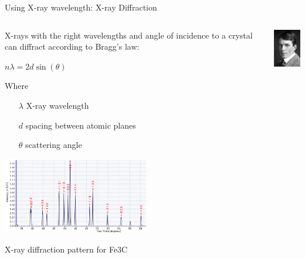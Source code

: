\begin{slide}{Using X-ray wavelength: X-ray Diffraction}

   \begin{columns}[T]
     \begin{column}{80mm}


       X-rays with the right wavelengths and angle of incidence to a
       crystal can diffract according to Bragg's law:

       \begin{center}
         \begin{postitbox}{28mm}
           {\Large{
               $  n\lambda = 2 d \sin(\theta) $
             }}
         \end{postitbox}
         \end{center}


       Where
       \begin{itemize}
       \item[$\lambda$]       X-ray wavelength
       \item[$d$]    spacing between atomic planes
       \item[$\theta$]        scattering angle
       \end{itemize}
         
     
     \includegraphics[width=64mm]{figs/images/XRD_Pattern}

     X-ray diffraction pattern for Fe3C
     
     \end{column}

     \begin{column}{47mm}

       \begin{columns}[T]
         
         \begin{column}{20mm}         
           \includegraphics[width=18mm]{figs/images/WLBragg}


\end{column}
\end{columns}
\end{column}
\end{columns}
\end{slide}
